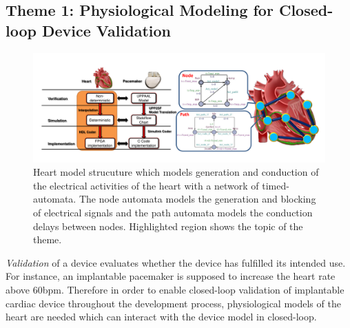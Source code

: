 \documentclass[a4paper,11pt]{article}
\begin{document}
%
%
%

\subsection{Theme 1: Physiological Modeling for Closed-loop Device Validation}
\begin{figure}[t]
	\centering
	\includegraphics[scale=0.32]{figs/mb_heart.pdf}
	\caption{\small Heart model strucuture which models generation and conduction of the electrical activities of the heart with a network of timed-automata. The node automata models the generation and blocking of electrical signals and the path automata models the conduction delays between nodes. Highlighted region shows the topic of the theme.}
	\label{fig:mb_heart}
\end{figure}
\emph{Validation} of a device evaluates whether the device has fulfilled its intended use.
For instance, an implantable pacemaker is supposed to increase the heart rate above 60bpm.
Therefore in order to enable closed-loop validation of implantable cardiac device throughout the development process, physiological models of the heart are needed which can interact with the device model in closed-loop. 
\end{document}
